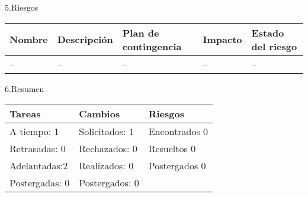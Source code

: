 \documentclass[12pt]{report}
\numberwithin{equation}{section}
\begin{document}
\begin{flushleft}
\large{5.Riesgos}\\


\begin{table}[H]
\begin{tabular}{|m{2cm}|m{4cm}|m{4cm}|m{2cm}|m{2cm}|}
\hline 
\textbf{Nombre } & \textbf{Descripci\'on} & \textbf{Plan de contingencia} & \textbf{Impacto} & \textbf{Estado del riesgo}  \\
\hline
\hline
\small{--} &\small{--} & \small{--} & --   & -- \\
\hline
\end{tabular}
\label{tabla: TABLA CE de nuevos riesgos Seg}
\end{table}

\large{6.Resumen}\\

\begin{table}[H]
\begin{tabular}{|m{5cm}|m{5cm}|m{5cm}|}
\hline
\textbf{Tareas} & \textbf{Cambios} & \textbf{Riesgos}\\
\hline \hline 
A tiempo: 1 & Solicitados: 1 & Encontrados 0 \\
\hline
Retrasadas: 0 & Rechazados: 0 & Resueltos 0 \\
\hline
Adelantadas:2  & Realizados: 0  & Postergados 0 \\
\hline
Postergadas: 0 & Postergados:  0 & \\
\hline
\end{tabular}
\label{tabla: TABLA CE Resumen}
\end{table}

\end{flushleft}

\newpage
\end{document}

